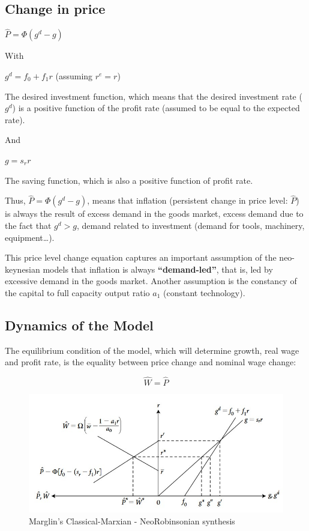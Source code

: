 \documentclass[
  letterpaper,
  DIV=11,
  numbers=noendperiod]{scrreprt}
\begin{document}
\hypertarget{change-in-price}{%
\subsection{Change in price}\label{change-in-price}}

\(\hat{P} = \Phi (g^d-g)\)

With

\(g^d = f_0 + f_1r\) (assuming \(r^e = r\))

The desired investment function, which means that the desired investment
rate (\(g^d\)) is a positive function of the profit rate (assumed to be
equal to the expected rate).

And

\(g = s_rr\)

The saving function, which is also a positive function of profit rate.

Thus, \(\hat{P} = \Phi (g^d-g)\), means that inflation (persistent
change in price level: \(\hat{P}\)) is always the result of excess
demand in the goods market, excess demand due to the fact that
\(g^d>g\), demand related to investment (demand for tools, machinery,
equipment\ldots).

This price level change equation captures an important assumption of the
neo-keynesian models that inflation is always \textbf{``demand-led''},
that is, led by excessive demand in the goods market. Another assumption
is the constancy of the capital to full capacity output ratio \(a_1\)
(constant technology).

\hypertarget{dynamics-of-the-model}{%
\subsection{Dynamics of the Model}\label{dynamics-of-the-model}}

The equilibrium condition of the model, which will determine growth,
real wage and profit rate, is the equality between price change and
nominal wage change:

\[\widehat{W} = \widehat{P}\]

\begin{figure}

{\centering \includegraphics{images/marglinsynthesis.jpg}

}

\caption{Marglin's Classical-Marxian - NeoRobinsonian synthesis}

\end{figure}
\end{document}
